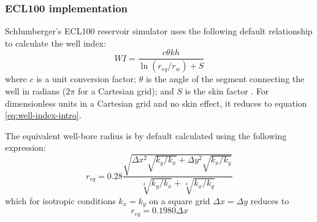 \subsubsection{ECL100 implementation} %
\label{ssub:ecl100_implementation}
Schlumberger's ECL100 reservoir simulator uses the following default relationship to calculate the well index:
\begin{equation}
    WI = \frac{c\theta k h}{\ln \left(r_{eq}/r_w\right)+S}
\end{equation}
where $c$ is a unit conversion factor; $\theta$ is the angle of the segment connecting the well in radians ($2\pi$ for a Cartesian grid); and $S$ is the skin factor \cite{Schlumberger2013Eclipse}. For dimensionless units in a Cartesian grid and no skin effect, it reduces to equation \eqref{eq:well-index-intro}.

The equivalent well-bore radius is by default calculated using the following expression:
\begin{equation}
    r_{eq} = 0.28 \frac{\sqrt{\Delta x^2 \sqrt{k_y/k_x} + \Delta y^2 \sqrt{k_x/k_y}}}{\sqrt[4]{k_y/k_x}+\sqrt[4]{k_x/k_y}}
\end{equation}
which for isotropic conditions $k_x=k_y$ on a square grid $\Delta x= \Delta y$ reduces to
\begin{equation}
    r_{eq} = 0.1980 \Delta x
\end{equation}


